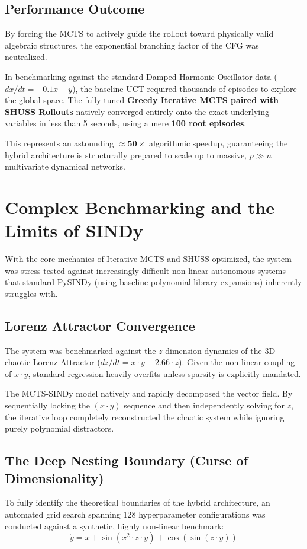 \documentclass[11pt, a4paper]{article}
\begin{document}
\subsection{Performance Outcome}
By forcing the MCTS to actively guide the rollout toward physically valid algebraic structures, the exponential branching factor of the CFG was neutralized. 

In benchmarking against the standard Damped Harmonic Oscillator data ($dx/dt = -0.1x + y$), the baseline UCT required thousands of episodes to explore the global space. The fully tuned \textbf{Greedy Iterative MCTS paired with SHUSS Rollouts} natively converged entirely onto the exact underlying variables in less than 5 seconds, using a mere \textbf{100 root episodes}. 

This represents an astounding $\approx \mathbf{50\times}$ algorithmic speedup, guaranteeing the hybrid architecture is structurally prepared to scale up to massive, $p \gg n$ multivariate dynamical networks.

\section{Complex Benchmarking and the Limits of SINDy}

With the core mechanics of Iterative MCTS and SHUSS optimized, the system was stress-tested against increasingly difficult non-linear autonomous systems that standard PySINDy (using baseline polynomial library expansions) inherently struggles with.

\subsection{Lorenz Attractor Convergence}
The system was benchmarked against the $z$-dimension dynamics of the 3D chaotic Lorenz Attractor ($dz/dt = x \cdot y - 2.66 \cdot z$). Given the non-linear coupling of $x \cdot y$, standard regression heavily overfits unless sparsity is explicitly mandated. 

The MCTS-SINDy model natively and rapidly decomposed the vector field. By sequentially locking the $(x \cdot y)$ sequence and then independently solving for $z$, the iterative loop completely reconstructed the chaotic system while ignoring purely polynomial distractors.

\subsection{The Deep Nesting Boundary (Curse of Dimensionality)}
To fully identify the theoretical boundaries of the hybrid architecture, an automated grid search spanning 128 hyperparameter configurations was conducted against a synthetic, highly non-linear benchmark:
\begin{equation}
    \dot{y} = x + \sin(x^2 \cdot z \cdot y) + \cos(\sin(z \cdot y))
\end{equation}
\end{document}
